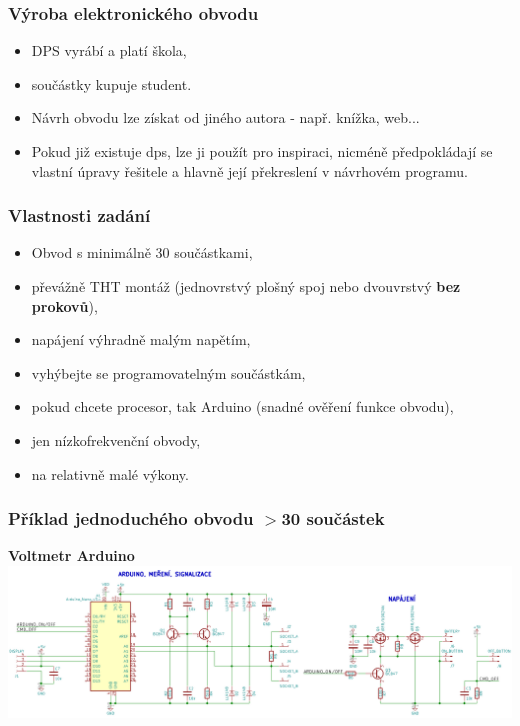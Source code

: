 \documentclass{beamer}
\begin{document}
	\begin{frame}
    \frametitle{Výroba elektronického obvodu}
		
		\begin{itemize}
			\item DPS vyrábí a platí škola,
			\item součástky kupuje student.
			\item Návrh obvodu lze získat od jiného autora - např. knížka, web...
			\item Pokud již existuje dps, lze ji použít pro inspiraci, nicméně předpokládají se vlastní úpravy řešitele a hlavně její překreslení v návrhovém programu.
		\end{itemize}
	
	\end{frame}
	\begin{frame}
    \frametitle{Vlastnosti zadání}
		
		\begin{itemize}
			\item Obvod s minimálně 30 součástkami,
			\item převážně THT montáž (jednovrstvý plošný spoj nebo dvouvrstvý \textbf{bez prokovů}),
      \item napájení výhradně malým napětím,
      \item vyhýbejte se programovatelným součástkám,
      \item pokud chcete procesor, tak Arduino (snadné ověření funkce obvodu),
      \item jen nízkofrekvenční obvody, 
      \item na relativně malé výkony.
		\end{itemize}
	
	\end{frame}
	\begin{frame}
    \frametitle{Příklad jednoduchého obvodu $>$30 součástek}
		\textbf{Voltmetr Arduino}
		\includegraphics[scale=0.24]{obr/eo_voltSch.png}
	
	\end{frame}
\end{document}
